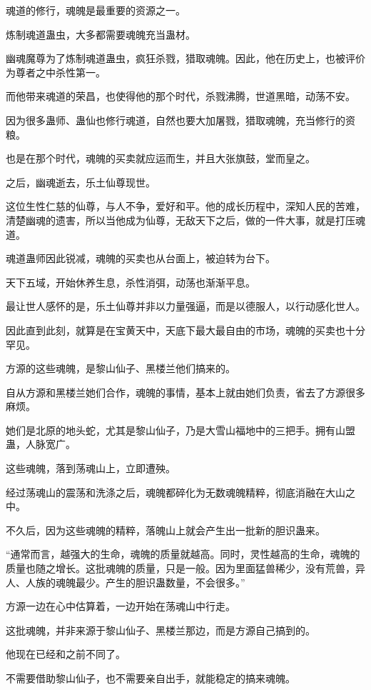 \begin{this_body}
魂道的修行，魂魄是最重要的资源之一。

炼制魂道蛊虫，大多都需要魂魄充当蛊材。

幽魂魔尊为了炼制魂道蛊虫，疯狂杀戮，猎取魂魄。因此，他在历史上，也被评价为尊者之中杀性第一。

而他带来魂道的荣昌，也使得他的那个时代，杀戮沸腾，世道黑暗，动荡不安。

因为很多蛊师、蛊仙也修行魂道，自然也要大加屠戮，猎取魂魄，充当修行的资粮。

也是在那个时代，魂魄的买卖就应运而生，并且大张旗鼓，堂而皇之。

之后，幽魂逝去，乐土仙尊现世。

这位生性仁慈的仙尊，与人不争，爱好和平。他的成长历程中，深知人民的苦难，清楚幽魂的遗害，所以当他成为仙尊，无敌天下之后，做的一件大事，就是打压魂道。

魂道蛊师因此锐减，魂魄的买卖也从台面上，被迫转为台下。

天下五域，开始休养生息，杀性消弭，动荡也渐渐平息。

最让世人感怀的是，乐土仙尊并非以力量强逼，而是以德服人，以行动感化世人。

因此直到此刻，就算是在宝黄天中，天底下最大最自由的市场，魂魄的买卖也十分罕见。

方源的这些魂魄，是黎山仙子、黑楼兰他们搞来的。

自从方源和黑楼兰她们合作，魂魄的事情，基本上就由她们负责，省去了方源很多麻烦。

她们是北原的地头蛇，尤其是黎山仙子，乃是大雪山福地中的三把手。拥有山盟蛊，人脉宽广。

这些魂魄，落到荡魂山上，立即遭殃。

经过荡魂山的震荡和洗涤之后，魂魄都碎化为无数魂魄精粹，彻底消融在大山之中。

不久后，因为这些魂魄的精粹，落魄山上就会产生出一批新的胆识蛊来。

“通常而言，越强大的生命，魂魄的质量就越高。同时，灵性越高的生命，魂魄的质量也随之增长。这批魂魄的质量，只是一般。因为里面猛兽稀少，没有荒兽，异人、人族的魂魄最少。产生的胆识蛊数量，不会很多。”

方源一边在心中估算着，一边开始在荡魂山中行走。

这批魂魄，并非来源于黎山仙子、黑楼兰那边，而是方源自己搞到的。

他现在已经和之前不同了。

不需要借助黎山仙子，也不需要亲自出手，就能稳定的搞来魂魄。


\end{this_body}
